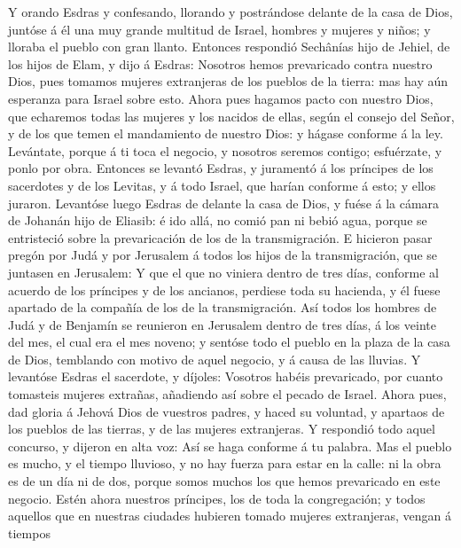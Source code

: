  Y orando Esdras y confesando, llorando y postrándose
delante de la casa de Dios, juntóse á él una muy grande multitud de
Israel, hombres y mujeres y niños; y lloraba el pueblo con gran llanto.
 Entonces respondió Sechânías hijo de Jehiel, de los hijos
de Elam, y dijo á Esdras: Nosotros hemos prevaricado contra nuestro
Dios, pues tomamos mujeres extranjeras de los pueblos de la tierra: mas
hay aún esperanza para Israel sobre esto.  Ahora pues
hagamos pacto con nuestro Dios, que echaremos todas las mujeres y los
nacidos de ellas, según el consejo del Señor, y de los que temen el
mandamiento de nuestro Dios: y hágase conforme á la ley. 
Levántate, porque á ti toca el negocio, y nosotros seremos contigo;
esfuérzate, y ponlo por obra.  Entonces se levantó Esdras,
y juramentó á los príncipes de los sacerdotes y de los Levitas, y á todo
Israel, que harían conforme á esto; y ellos juraron. 
Levantóse luego Esdras de delante la casa de Dios, y fuése á la cámara
de Johanán hijo de Eliasib: é ido allá, no comió pan ni bebió agua,
porque se entristeció sobre la prevaricación de los de la
transmigración.  E hicieron pasar pregón por Judá y por
Jerusalem á todos los hijos de la transmigración, que se juntasen en
Jerusalem:  Y que el que no viniera dentro de tres días,
conforme al acuerdo de los príncipes y de los ancianos, perdiese toda su
hacienda, y él fuese apartado de la compañía de los de la
transmigración.  Así todos los hombres de Judá y de
Benjamín se reunieron en Jerusalem dentro de tres días, á los veinte del
mes, el cual era el mes noveno; y sentóse todo el pueblo en la plaza de
la casa de Dios, temblando con motivo de aquel negocio, y á causa de las
lluvias.  Y levantóse Esdras el sacerdote, y díjoles:
Vosotros habéis prevaricado, por cuanto tomasteis mujeres extrañas,
añadiendo así sobre el pecado de Israel.  Ahora pues, dad
gloria á Jehová Dios de vuestros padres, y haced su voluntad, y apartaos
de los pueblos de las tierras, y de las mujeres extranjeras.
 Y respondió todo aquel concurso, y dijeron en alta voz:
Así se haga conforme á tu palabra.  Mas el pueblo es
mucho, y el tiempo lluvioso, y no hay fuerza para estar en la calle: ni
la obra es de un día ni de dos, porque somos muchos los que hemos
prevaricado en este negocio.  Estén ahora nuestros
príncipes, los de toda la congregación; y todos aquellos que en nuestras
ciudades hubieren tomado mujeres extranjeras, vengan á tiempos
